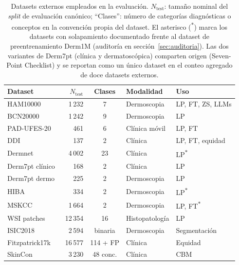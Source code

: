 \begin{table}[htbp]
\centering
\footnotesize
\setlength{\tabcolsep}{4pt}
\renewcommand{\arraystretch}{0.95}
\caption{Datasets externos empleados en la evaluación.
$N_{\mathrm{test}}$: tamaño nominal del \emph{split} de evaluación
canónico; ``Clases'': número de categorías diagnósticas o conceptos
en la convención propia del dataset. El asterisco
(\textsuperscript{$\ast$}) marca los datasets con solapamiento
documentado frente al dataset de preentrenamiento Derm1M
(auditoría en sección~\ref{sec:auditoria}). Las dos variantes de Derm7pt
(clínica y dermatoscópica) comparten origen
(Seven-Point Checklist) y se reportan como un único dataset en el
conteo agregado de doce datasets externos.}
\label{tab:datasets-resumen}
\begin{tabular}{lrcll}
\hline
Dataset & $N_{\mathrm{test}}$ & Clases & Modalidad & Uso \\
\hline
HAM10000~\cite{ham10000}             & 1\,232  & 7        & Dermoscopia      & LP, FT, ZS, LLMs \\
BCN20000~\cite{bcn20000}             & 1\,242  & 9        & Dermoscopia      & LP \\
PAD-UFES-20~\cite{padufes}           & 461     & 6        & Clínica móvil    & LP, FT \\
DDI~\cite{ddi}                       & 137     & 2        & Clínica          & LP, FT, equidad \\
Dermnet~\cite{dermnet}               & 4\,002  & 23       & Clínica          & LP\textsuperscript{$\ast$} \\
Derm7pt clínico~\cite{kawahara2019}  & 168     & 2        & Clínica          & LP \\
Derm7pt dermo~\cite{kawahara2019}    & 225     & 2        & Dermoscopia      & LP \\
HIBA                                 & 334     & 2        & Dermoscopia      & LP\textsuperscript{$\ast$} \\
MSKCC                                & 1\,664  & 2        & Dermoscopia      & LP, FT\textsuperscript{$\ast$} \\
WSI patches                          & 12\,354 & 16       & Histopatología   & LP \\
ISIC2018~\cite{isic2018}             & 2\,594  & binaria  & Dermoscopia      & Segmentación \\
Fitzpatrick17k~\cite{fitzpatrick17k} & 16\,577 & 114 + FP & Clínica          & Equidad \\
SkinCon~\cite{skincon}               & 3\,230  & 48 conc. & Clínica          & CBM \\
\hline
\end{tabular}
\end{table}

